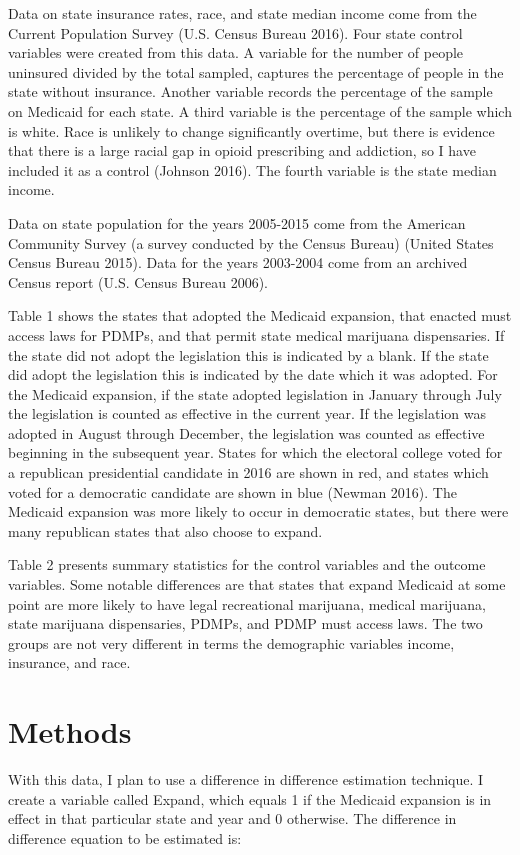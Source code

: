 \documentclass{article}
\begin{document}
Data on state insurance rates, race, and state median income come from the Current Population Survey (U.S. Census Bureau 2016).  Four state control variables were created from this data.  A variable for the number of people uninsured divided by the total sampled, captures the percentage of people in the state without insurance.  Another variable records the percentage of the sample on Medicaid for each state.  A third variable is the percentage of the sample which is white.  Race is unlikely to change significantly overtime, but there is evidence that there is a large racial gap in opioid prescribing and addiction, so I have included it as a control (Johnson 2016).  The fourth variable is the state median income.  

Data on state population for the years 2005-2015 come from the American Community Survey (a survey conducted by the Census Bureau) (United States Census Bureau 2015).  Data for the years 2003-2004 come from an archived Census report (U.S. Census Bureau 2006).  

Table 1 shows the states that adopted the Medicaid expansion, that enacted must access laws for PDMPs, and that permit state medical marijuana dispensaries.  If the state did not adopt the legislation this is indicated by a blank.  If the state did adopt the legislation this is indicated by the date which it was adopted.  For the Medicaid expansion, if the state adopted legislation in January through July the legislation is counted as effective in the current year.  If the legislation was adopted in August through December, the legislation was counted as effective beginning in the subsequent year.   States for which the electoral college voted for a republican presidential candidate in 2016 are shown in red, and states which voted for a democratic candidate are shown in blue (Newman 2016).  The Medicaid expansion was more likely to occur in democratic states, but there were many republican states that also choose to expand.  

Table 2 presents summary statistics for the control variables and the outcome variables.  Some notable differences are that states that expand Medicaid at some point are more likely to have legal recreational marijuana, medical marijuana, state marijuana dispensaries, PDMPs, and PDMP must access laws.  The two groups are not very different in terms the demographic variables income, insurance, and race.  

\section{Methods}
With this data, I plan to use a difference in difference estimation technique. I create a variable called Expand, which equals 1 if the Medicaid expansion is in effect in that particular state and year and 0 otherwise.  The difference in difference equation to be estimated is:
\end{document}
